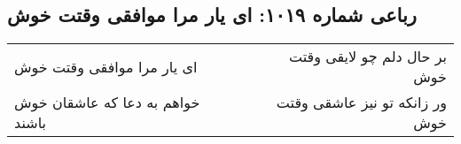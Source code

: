 \begin{center}
\section*{رباعی شماره ۱۰۱۹: ای یار مرا موافقی وقتت خوش}
\label{sec:1019}
\begin{longtable}{l p{0.5cm} r}
ای یار مرا موافقی وقتت خوش
&&
بر حال دلم چو لایقی وقتت خوش
\\
خواهم به دعا که عاشقان خوش باشند
&&
ور زانکه تو نیز عاشقی وقتت خوش
\\
\end{longtable}
\end{center}
